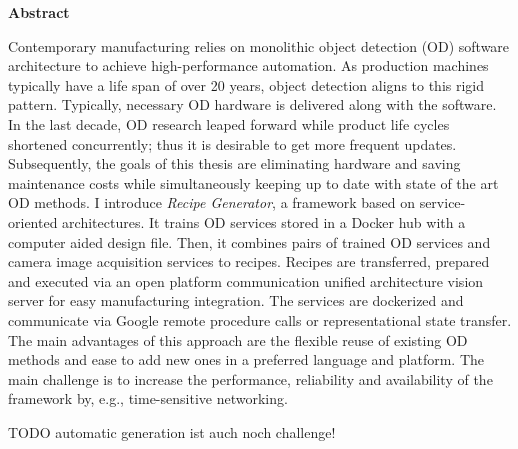 \thispagestyle{empty}
\vspace*{1.0cm}

\begin{center}
    \textbf{Abstract}
\end{center}

\vspace*{0.5cm}

\noindent
Contemporary manufacturing relies on monolithic object detection (OD) software architecture to achieve high-performance automation. As production machines typically have a life span of over 20 years, object detection aligns to this rigid pattern. Typically, necessary OD hardware is delivered along with the software. In the last decade, OD research leaped forward while product life cycles shortened concurrently; thus it is desirable to get more frequent updates. Subsequently, the goals of this thesis are eliminating hardware and saving maintenance costs while simultaneously keeping up to date with state of the art OD methods. I introduce \textit{Recipe Generator}, a framework based on service-oriented architectures. It trains OD services stored in a Docker hub with a computer aided design file. Then, it combines pairs of trained OD services and camera image acquisition services to recipes. Recipes are transferred, prepared and executed via an open platform communication unified architecture vision server for easy manufacturing integration. The services are dockerized and communicate via Google remote procedure calls or representational state transfer. The main advantages of this approach are the flexible reuse of existing OD methods and ease to add new ones in a preferred language and platform. The main challenge is to increase the performance, reliability and availability of the framework by, e.g., time-sensitive networking.

TODO automatic generation ist auch noch challenge!
